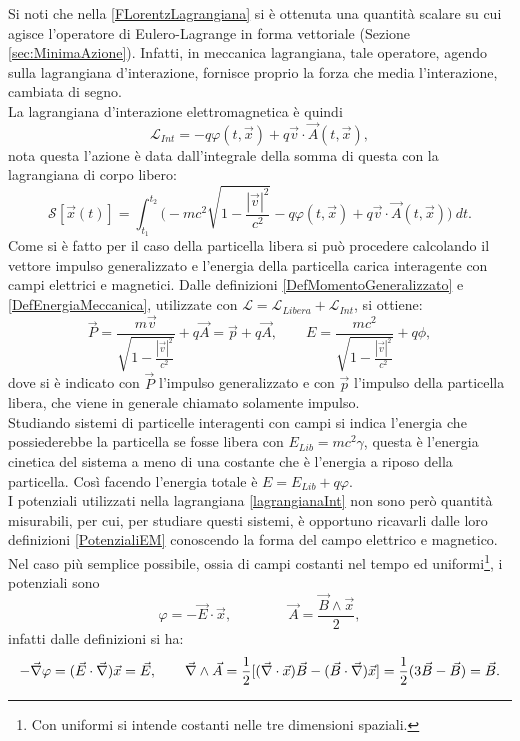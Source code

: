 Si noti che nella \eqref{FLorentzLagrangiana} si è ottenuta una quantità scalare su cui agisce l'operatore di Eulero-Lagrange in forma vettoriale (Sezione \ref{sec:MinimaAzione}). Infatti, in meccanica lagrangiana, tale operatore, agendo sulla lagrangiana d'interazione, fornisce proprio la forza che media l'interazione, cambiata di segno.\\ La lagrangiana d'interazione elettromagnetica è quindi
\begin{equation}
    \label{lagrangianaInt}
    \mathcal{L}_{Int}=-q\varphi(t,\vec x)+q\vec v\cdot\vec A(t,\vec x),
\end{equation}
nota questa l'azione è data dall'integrale della somma di questa con la lagrangiana di corpo libero:
\begin{equation}
    \mathcal{S} [\vec x(t)]=\int_{t_1}^{t_2}\bigg(-mc^2\sqrt{1-\frac{|\vec v|^2}{c^2}}-q\varphi(t,\vec x)+q\vec v\cdot\vec A(t,\vec x)\bigg)\ dt.\label{AzioneFree+Int}
\end{equation}
Come si è fatto per il caso della particella libera si può procedere calcolando il vettore impulso generalizzato e l'energia della particella carica interagente con campi elettrici e magnetici. Dalle definizioni \eqref{DefMomentoGeneralizzato} e \eqref{DefEnergiaMeccanica}, utilizzate con $\mathcal{L} =\mathcal{L}_{Libera}+\mathcal{L}_{Int}$, si ottiene:
\begin{equation}
    \vec{P}=\frac{m\vec v}{\sqrt{1-\frac{|\vec v|^2}{c^2}}}+q\vec A=\vec{p}+q\vec A,\qquad E=\frac{mc^2}{\sqrt{1-\frac{|\vec v|^2}{c^2}}}+q\phi,\label{energiaImpulsoIntEM}
\end{equation}
dove si è indicato con $\vec P$ l'impulso generalizzato e con $\vec p$ l'impulso della particella libera, che viene in generale chiamato solamente impulso.\\Studiando sistemi di particelle interagenti con campi si indica l'energia che possiederebbe la particella se fosse libera con $E_{Lib}=mc^2\gamma$, questa è l'energia cinetica del sistema a meno di una costante che è l'energia a riposo della particella. Così facendo l'energia totale è $E=E_{Lib}+q\varphi$.\\

I potenziali utilizzati nella lagrangiana \eqref{lagrangianaInt} non sono però quantità misurabili, per cui, per studiare questi sistemi, è opportuno ricavarli dalle loro definizioni \eqref{PotenzialiEM} conoscendo la forma del campo elettrico e magnetico. Nel caso più semplice possibile, ossia di campi costanti nel tempo ed uniformi\footnote{Con uniformi si intende costanti nelle tre dimensioni spaziali.}, i potenziali sono 
\begin{equation}
    \varphi=-\vec E\cdot\vec x, \qquad \qquad \vec A=\frac{\vec B\wedge \vec x}{2},\label{PotenzialiCostanti}
\end{equation}
infatti dalle definizioni si ha:
\begin{equation*}
    -\vec{\nabla}{\varphi}=(\vec E\cdot\vec{\nabla})\vec x=\vec{E},\qquad \vec{\nabla}\wedge\vec A=\frac{1}{2}[ (\vec{\nabla}\cdot\vec x)\vec B-(\vec B\cdot \vec{\nabla})\vec x]=\frac{1}{2}(3\vec B -\vec B)=\vec B.
\end{equation*}
